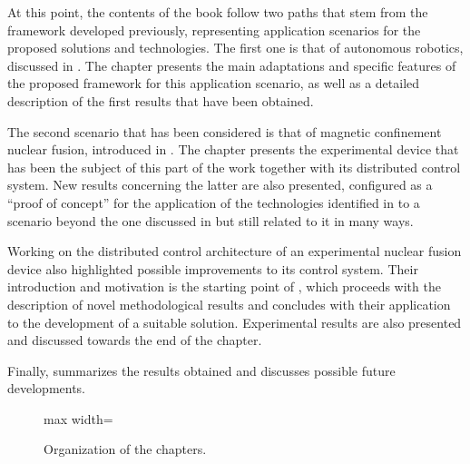 At this point, the contents of the book follow two paths that stem from the framework developed previously, representing application scenarios for the proposed solutions and technologies. The first one is that of autonomous robotics, discussed in . The chapter presents the main adaptations and specific features of the proposed framework for this application scenario, as well as a detailed description of the first results that have been obtained.

The second scenario that has been considered is that of magnetic confinement nuclear fusion, introduced in . The chapter presents the experimental device that has been the subject of this part of the work together with its distributed control system. New results concerning the latter are also presented, configured as a ``proof of concept'' for the application of the technologies identified in  to a scenario beyond the one discussed in  but still related to it in many ways.

Working on the distributed control architecture of an experimental nuclear fusion device also highlighted possible improvements to its control system. Their introduction and motivation is the starting point of , which proceeds with the description of novel methodological results and concludes with their application to the development of a suitable solution. Experimental results are also presented and discussed towards the end of the chapter.

Finally,  summarizes the results obtained and discusses possible future developments.

\begin{figure}[ht]
  \centering
  \begin{adjustbox}{max width=\linewidth}\end{adjustbox}
  \caption{Organization of the chapters.}
  \label{fig:chapters}
\end{figure}
